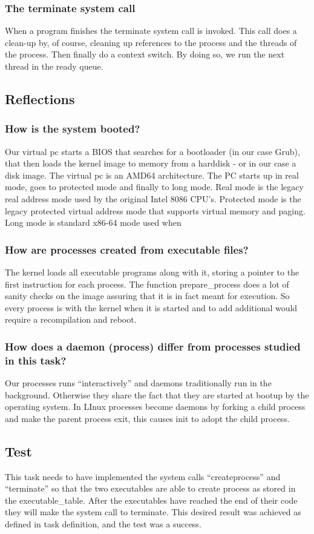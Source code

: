 \subsubsection*{The terminate system call}
When a program finishes the terminate system call is invoked. This call does a clean-up by, of course, cleaning up references to the process 
and the threads of the process. Then finally do a context switch. By doing so, we run the next thread in the ready queue.

\subsection{Reflections}

\subsubsection*{How is the system booted?}
Our virtual pc starts a BIOS that searches for a bootloader (in our case Grub), that then loads the kernel image to memory from a harddisk - or in our case a disk image. The virtual pc is an AMD64 architecture. The PC starts up in real mode, goes to protected mode and finally to long mode. Real mode is the legacy real address mode used by the original Intel 8086 CPU's. Protected mode is the legacy protected virtual address mode that supports virtual memory and paging. Long mode is standard x86-64 mode used when

\subsubsection*{How are processes created from executable files?}
The kernel loads all executable programs along with it, storing a pointer to the first instruction for each process. The function prepare\_process does a lot of sanity checks on the image assuring that it is in fact meant for execution. So every process is with the kernel when it is started and to add additional would require a recompilation and reboot.

\subsubsection*{How does a daemon (process) differ from processes studied in this task?}
Our processes runs ``interactively'' and daemons traditionally run in the background. Otherwise they share the fact that they are started at bootup by the operating system. In LInux processes become daemons by forking a child process and make the parent process exit, this causes init to adopt the child process.

\subsection{Test}
This task needs to have implemented the system calls ``createprocess'' and ``terminate'' so that the two executables are able to create process as stored in the executable\_table. After the executables have reached the end of their code they will make the system call to terminate. This desired result was achieved as defined in task definition, and the test was a success.